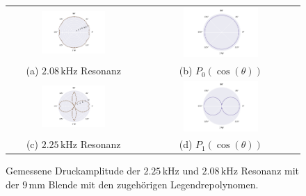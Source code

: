 \begin{figure}[H]
  \centering
  \begin{tabular}{cc}
    \includegraphics[width=0.5\textwidth]{Daten/Wasserstoff/peak9mm1.pdf} &   \includegraphics[width=0.5\textwidth]{Daten/Wasserstoffmolekuelion/peakLeg.pdf} \\
  (a) $2.08 \,\si{\kilo\hertz}$ Resonanz & (b) $P_0(\cos(\theta))$ \\[6pt]
  \includegraphics[width=0.5\textwidth]{Daten/Wasserstoff/peak9mm.pdf} &   \includegraphics[width=0.5\textwidth]{Daten/Wasserstoff/peakLeg0.pdf} \\
  (c) $2.25 \,\si{\kilo\hertz}$ Resonanz & (d) $P_1(\cos(\theta))$ \\[6pt]
  \end{tabular}
  \caption{Gemessene Druckamplitude der $2.25 \,\si{\kilo\hertz}$ und $2.08 \,\si{\kilo\hertz}$ Resonanz mit der $9 \,\si{\milli\metre}$ Blende mit den zugehörigen Legendrepolynomen.} 
  \label{fig:9mm}
\end{figure}
